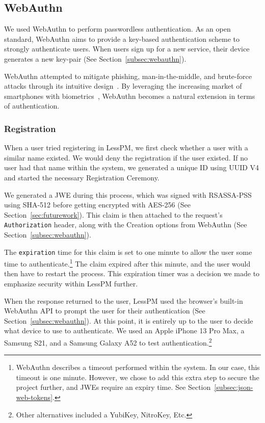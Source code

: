 \subsection{WebAuthn}\label{subsec:webauthn-methodology}
We used WebAuthn to perform passwordless authentication.
As an open standard, WebAuthn aims to provide a key-based authentication scheme
to strongly authenticate users.
When users sign up for a new service, their device generates a new key-pair
(See Section~\ref{subsec:webauthn}).

WebAuthn attempted to mitigate phishing, man-in-the-middle, and brute-force
attacks through its intuitive design~\cite{webauthn_level_2}.
By leveraging the increasing market of smartphones with
biometrics~\cite{statista-biometric-transactions}, WebAuthn becomes a natural
extension in terms of authentication.

\subsubsection{Registration}\label{subsubsec:metho-registration}
When a user tried registering in LessPM, we first check whether a user with a
similar name existed.
We would deny the registration if the user existed.
If no user had that name within the system, we generated a unique ID using UUID
V4 and started the necessary Registration Ceremony.

We generated a JWE during this process, which was signed with RSASSA-PSS using
SHA-512 before getting encrypted with AES-256
(See Section~\ref{sec:futurework}).
This claim is then attached to the request's \texttt{Authorization} header,
along with the Creation options from WebAuthn
(See Section~\ref{subsec:webauthn}).

The \texttt{expiration} time for this claim is set to one minute to allow the
user some time to authenticate.\footnote{
  WebAuthn describes a timeout performed within the system. In our case, this
  timeout is one minute.
  However, we chose to add this extra step to secure the project further, and JWEs require an expiry time. See Section~\ref{subsec:json-web-tokens}.
}
The claim expired after this minute, and the user would then have to restart the
process.
This expiration timer was a decision we made to emphasize security within LessPM
further.

When the response returned to the user, LessPM used the browser's built-in
WebAuthn API to prompt the user for their authentication
(See Section~\ref{subsec:webauthn}).
At this point, it is entirely up to the user to decide what device to use to
authenticate.
We used an Apple iPhone 13 Pro Max, a Samsung S21, and a Samsung Galaxy A52 to
test authentication.\footnote{
  Other alternatives included a YubiKey, NitroKey, Etc.
}

